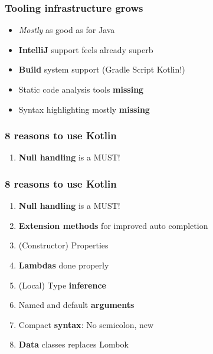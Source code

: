 

\begin{frame}
\frametitle{Tooling infrastructure grows}
\begin{itemize}[<+->]
	\item \textit{Mostly} as good as for Java
	\item \textbf{IntelliJ} support feels already superb
	\item \textbf{Build} system support (Gradle Script Kotlin!)
	\item Static code analysis tools \textbf{missing}
	\item Syntax highlighting mostly \textbf{missing}
\end{itemize}
\end{frame}

\begin{frame}
\frametitle{8 reasons to use Kotlin}
\begin{enumerate}
	\item \textbf{Null handling} is a MUST!
\end{enumerate}
\vspace{4.1cm}
\end{frame}



\begin{frame}
\frametitle{8 reasons to use Kotlin}
\begin{enumerate}[<+->]
	\item \textbf{Null handling} is a MUST!
	\item \textbf{Extension methods} for improved auto completion
	\item (Constructor) Properties
	\item \textbf{Lambdas} done properly
	\item (Local) Type \textbf{inference}
	\item Named and default \textbf{arguments}
	\item Compact \textbf{syntax}: No semicolon, new
	\item \textbf{Data} classes replaces Lombok
\end{enumerate}
\end{frame}

